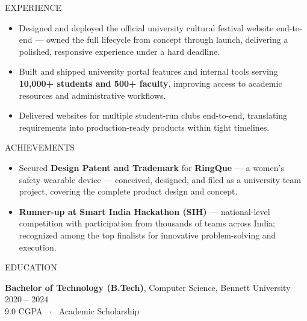\documentclass{resume} %
\begin{document}
\begin{rSection}{EXPERIENCE}
\begin{itemize}
    \item Designed and deployed the official university cultural festival website end-to-end — owned the full lifecycle from concept through launch, delivering a polished, responsive experience under a hard deadline.

    \item Built and shipped university portal features and internal tools serving \textbf{10,000+ students and 500+ faculty}, improving access to academic resources and administrative workflows.

    \item Delivered websites for multiple student-run clubs end-to-end, translating requirements into production-ready products within tight timelines.

\end{itemize}

\end{rSection}

\begin{rSection}{ACHIEVEMENTS}
\begin{itemize}

    \item Secured \textbf{Design Patent and Trademark} for \textbf{RingQue} — a women's safety wearable device — conceived, designed, and filed as a university team project, covering the complete product design and concept.

    \item \textbf{Runner-up at Smart India Hackathon (SIH)} — national-level competition with participation from thousands of teams across India; recognized among the top finalists for innovative problem-solving and execution.

\end{itemize}
\end{rSection}

\begin{rSection}{EDUCATION}

{\bf Bachelor of Technology (B.Tech)}, Computer Science, Bennett University \hfill {2020 -- 2024}\\
9.0 CGPA \ $\cdot$ \ Academic Scholarship

\end{rSection}
\end{document}
